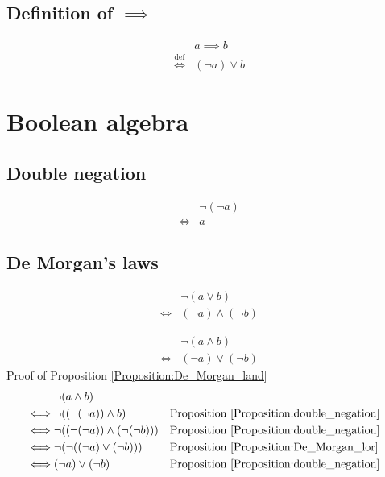 \subsection{Definition of $\implies$}
\begin{defn}
\label{Definition:implies}
\begin{align*}
& a \implies b \\
\overset{\operatorname{def}}{\iff} & (\lnot a) \lor b
\end{align*}
\end{defn}

\section{Boolean algebra}
\subsection{Double negation}
\begin{prop}
\label{Proposition:double_negation}
\begin{align*}
& \lnot (\lnot a) \\
\iff & a
\end{align*}
\end{prop}

\subsection{De Morgan's laws}
\begin{prop}
\label{Proposition:De_Morgan_lor}
\begin{align*}
& \lnot (a \lor b) \\
\iff & (\lnot a) \land (\lnot b)
\end{align*}
\end{prop}

\begin{prop}
\label{Proposition:De_Morgan_land}
\begin{align*}
& \lnot (a \land b) \\
\iff & (\lnot a) \lor (\lnot b)
\end{align*}
Proof of Proposition \ref{Proposition:De_Morgan_land}
\begin{align*}
& \lnot (a \land b) \\
\iff & \lnot ((\lnot (\lnot a)) \land b)
& & \text{Proposition \ref{Proposition:double_negation}} \\
\iff & \lnot ((\lnot (\lnot a)) \land (\lnot (\lnot b)))
& & \text{Proposition \ref{Proposition:double_negation}} \\
\iff & \lnot (\lnot ((\lnot a) \lor (\lnot b)))
& & \text{Proposition \ref{Proposition:De_Morgan_lor}} \\
\iff & (\lnot a) \lor (\lnot b)
& & \text{Proposition \ref{Proposition:double_negation}} \\
\end{align*}
\end{prop}

